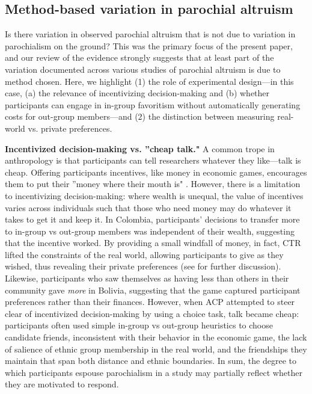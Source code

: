 \documentclass[bibauthoryear]{aa}
\begin{document}
\subsection{Method-based variation in parochial altruism}

Is there variation in observed parochial altruism that is not due to variation in parochialism on the ground? This was the primary focus of the present paper, and our review of the evidence strongly suggests that at least part of the variation documented across various studies of parochial altruism is due to method chosen. Here, we highlight (1) the role of experimental design---in this case, (a) the relevance of incentivizing decision-making and (b) whether participants can engage in in-group favoritism without automatically generating costs for out-group members---and (2) the distinction between measuring real-world vs. private preferences.

\textbf{Incentivized decision-making vs. ''cheap talk."} A common trope in anthropology is that participants can tell researchers whatever they like---talk is cheap. Offering participants incentives, like money in economic games, encourages them to put their ''money where their mouth is" \citep{xygalatasreligious, gurven2008collective, Pisor2020}. However, there is a limitation to incentivizing decision-making: where wealth is unequal, the value of incentives varies across individuals such that those who need money may do whatever it takes to get it and keep it. In Colombia, participants' decisions to transfer more to in-group vs out-group members was independent of their wealth, suggesting that the incentive worked. By providing a small windfall of money, in fact, CTR lifted the constraints of the real world, allowing participants to give as they wished, thus revealing their private preferences (see \citet{Pisor2020} for further discussion). Likewise, participants who saw themselves as having less than others in their community gave \emph{more} in Bolivia, suggesting that the game captured participant preferences rather than their finances. However, when ACP attempted to steer clear of incentivized decision-making by using a choice task, talk became cheap: participants often used simple in-group vs out-group heuristics to choose candidate friends, inconsistent with their behavior in the economic game, the lack of salience of ethnic group membership in the real world, and the friendships they maintain that span both distance and ethnic boundaries. In sum, the degree to which participants espouse parochialism in a study may partially reflect whether they are motivated to respond.
\end{document}
